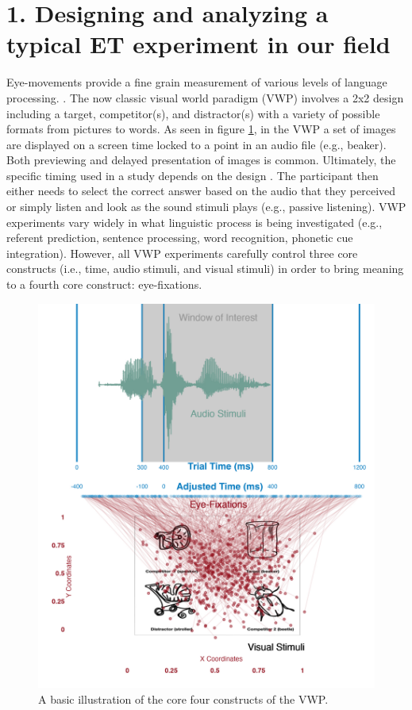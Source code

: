 \section{1. Designing and analyzing a typical ET experiment in our field }
Eye-movements provide a fine grain measurement of various levels of language processing.
\parencite[e.g.][]{Tanenhaus_Spivey-Knowlton_Eberhard_Sedivy_1995,Allopenna_1998}. The now classic visual world paradigm (VWP) involves a 2x2 design including a target, competitor(s), and distractor(s) with a variety of possible formats from pictures to words. As seen in figure \ref{fig:core_four}, in the VWP a set of images are displayed on a screen time locked to a point in an audio file (e.g., beaker). Both previewing and delayed presentation of images is common. Ultimately, the specific timing used in a study depends on the design  \parencite[see,][, for a review]{Apfelbaum_Klein-Packard_McMurray_2021}{}{}.  The participant then either needs to select the correct answer based on the audio that they perceived or simply listen and look as the sound stimuli plays (e.g., passive listening). VWP experiments vary widely in what linguistic process is being investigated (e.g., referent prediction, sentence processing, word recognition, phonetic cue integration). However, all VWP experiments carefully control three core constructs (i.e., time, audio stimuli, and visual stimuli) in order to bring meaning to a fourth core construct: eye-fixations. 

\begin{figure}[ht]
    \centering
    \includegraphics[scale=.182]{figures/Core_four_R.jpeg}
    \caption{A basic illustration of the core four constructs of the VWP. }
    \label{fig:core_four}
\end{figure}

